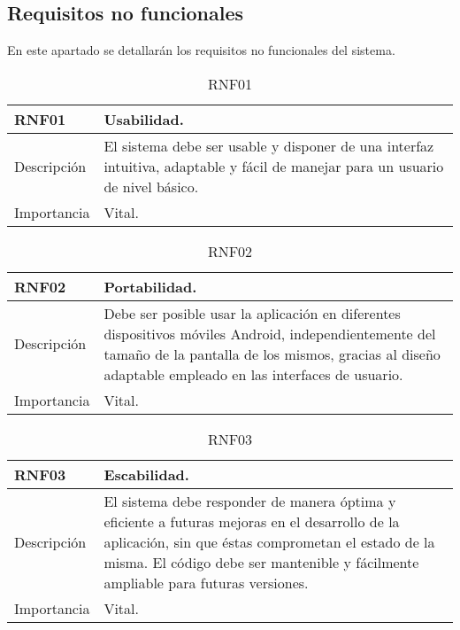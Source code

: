 \subsection{Requisitos no funcionales}

En este apartado se detallarán los requisitos no funcionales del sistema.

\begin{table}[H]
\label{RNF01}
\begin{center}
\begin{tabular}{| l | p{10cm} |}
\hline
RNF01 & Usabilidad.\\
\hline
Descripción & El sistema debe ser usable y disponer de una interfaz intuitiva, adaptable y fácil de manejar para un usuario de nivel básico.\\
\hline
Importancia & Vital.\\
\hline
\end{tabular}
\end{center}
\caption{RNF01}
\end{table} 

\begin{table}[H]
\label{RNF02}
\begin{center}
\begin{tabular}{| l | p{10cm} |}
\hline
RNF02 & Portabilidad.\\
\hline
Descripción & Debe ser posible usar la aplicación en diferentes dispositivos móviles Android, independientemente del tamaño de la pantalla de los mismos, gracias al diseño adaptable empleado en las interfaces de usuario.\\
\hline
Importancia & Vital.\\
\hline
\end{tabular}
\end{center}
\caption{RNF02}
\end{table}

\begin{table}[H]
\label{RNF03}
\begin{center}
\begin{tabular}{| l | p{10cm} |}
\hline
RNF03 & Escabilidad.\\
\hline
Descripción & El sistema debe responder de manera óptima y eficiente a futuras mejoras en el desarrollo de la aplicación, sin que éstas comprometan el estado de la misma. El código debe ser mantenible y fácilmente ampliable para futuras versiones.\\
\hline
Importancia & Vital.\\
\hline
\end{tabular}
\end{center}
\caption{RNF03}
\end{table}

